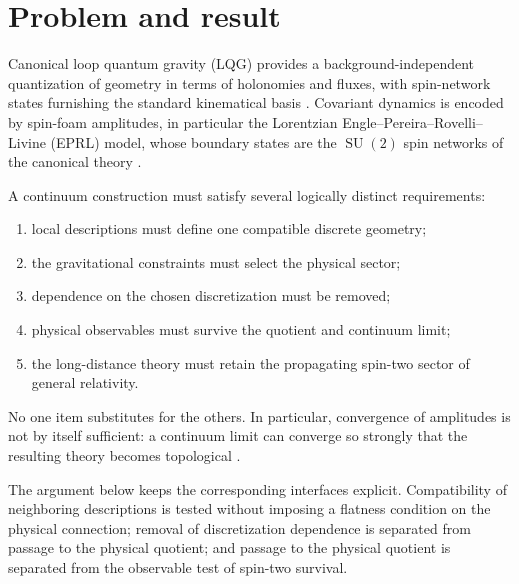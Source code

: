 \documentclass[aps,prd,reprint,nofootinbib,superscriptaddress]{revtex4-2}
\newcommand{\SU}{\operatorname{SU}}
\begin{document}
\maketitle

\section{Problem and result}

Canonical loop quantum gravity (LQG) provides a background-independent quantization of geometry in terms of holonomies and fluxes, with spin-network states furnishing the standard kinematical basis \cite{AshtekarLewandowski2004,AshtekarBianchi2021}. Covariant dynamics is encoded by spin-foam amplitudes, in particular the Lorentzian Engle--Pereira--Rovelli--Livine (EPRL) model, whose boundary states are the $\SU(2)$ spin networks of the canonical theory \cite{EnglePereiraRovelli2007,Perez2013}.

A continuum construction must satisfy several logically distinct requirements:
\begin{enumerate}[label=(\roman*),leftmargin=2.1em]
\item local descriptions must define one compatible discrete geometry;
\item the gravitational constraints must select the physical sector;
\item dependence on the chosen discretization must be removed;
\item physical observables must survive the quotient and continuum limit;
\item the long-distance theory must retain the propagating spin-two sector of general relativity.
\end{enumerate}
No one item substitutes for the others. In particular, convergence of amplitudes is not by itself sufficient: a continuum limit can converge so strongly that the resulting theory becomes topological \cite{BrunoEtAl2026}.

The argument below keeps the corresponding interfaces explicit. Compatibility of neighboring descriptions is tested without imposing a flatness condition on the physical connection; removal of discretization dependence is separated from passage to the physical quotient; and passage to the physical quotient is separated from the observable test of spin-two survival.
\end{document}
